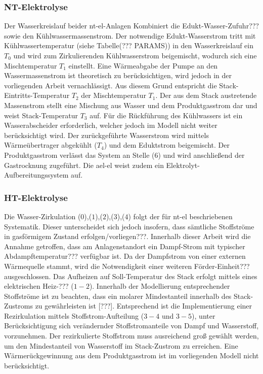 \documentclass[onecolumn,10pt,titlepage]{article}
\begin{document}
\subsubsection{NT-Elektrolyse}
\label{subsubs_peri_schem_NT}
Der Wasserkreislauf beider \gls{nt}-\gls{el}-Anlagen Kombiniert die Edukt-Wasser-Zufuhr??? sowie den Kühlwassermassenstrom. Der notwendige Edukt-Wasserstrom tritt mit Kühlwassertemperatur (siehe Tabelle(??? PARAMS)) in den Wasserkreislauf ein $T_0$ und wird zum Zirkulierenden Kühlwasserstrom beigemischt, wodurch sich eine Mischtemperatur $T_1$ einstellt. Eine Wärmeabgabe der Pumpe an den Wassermassenstrom ist theoretisch zu berücksichtigen, wird jedoch in der vorliegenden Arbeit vernachlässigt. Aus diesem Grund entspricht die Stack-Eintritts-Temperatur $T_2$ der Mischtemperatur $T_1$. Der aus dem Stack austretende Massenstrom stellt eine Mischung aus Wasser und dem Produktgasstrom dar und weist Stack-Temperatur $T_3$ auf. Für die Rückführung des Kühlwassers ist ein Wasserabscheider erforderlich, welcher jedoch im Modell nicht weiter berücksichtigt wird. Der zurückgeführte Wasserstrom wird mittels Wärmeübertrager abgekühlt ($T_4$) und dem Eduktstrom beigemischt. Der Produktgasstrom verlässt das System an Stelle (6) und wird anschließend der Gastrocknung zugeführt. Die \gls{ael}-\gls{el} weist zudem ein Elektrolyt-Aufbereitungssystem auf.

\subsubsection{HT-Elektrolyse}  
\label{subsubs_peri_schem_HT}
Die Wasser-Zirkulation ($0$),($1$),($2$),($3$),($4$) folgt der für \gls{nt}-\gls{el} beschriebenen Systematik. Dieser unterscheidet sich jedoch insofern, dass sämtliche Stoffströme in gasförmigem Zustand erfolgen/vorliegen???. Innerhalb dieser Arbeit wird die Annahme getroffen, dass am Anlagenstandort ein Dampf-Strom mit typischer Abdampftemperatur??? verfügbar ist. Da der Dampfstrom von einer externen Wärmequelle stammt, wird die Notwendigkeit einer weiteren Förder-Einheit??? ausgeschlossen. Das Aufheizen auf Soll-Temperatur des Stack erfolgt mittels eines elektrischen Heiz-??? ($1-2$). Innerhalb der Modellierung entsprechender Stoffströme ist zu beachten, dass ein molarer Mindestanteil innerhalb des Stack-Zustroms zu gewährleisten ist [???]. Entsprechend ist die Implementierung einer Rezirkulation mittels Stoffstrom-Aufteilung ($3-4$ und $3-5$), unter Berücksichtigung sich verändernder Stoffstromanteile von Dampf und Wasserstoff, vorzunehmen. Der rezirkulierte Stoffstrom muss ausreichend groß gewählt werden, um den Mindestanteil von Wasserstoff im Stack-Zustrom zu erreichen. Eine Wärmerückgewinnung aus dem Produktgasstrom ist im vorliegenden Modell nicht berücksichtigt.
\end{document}

